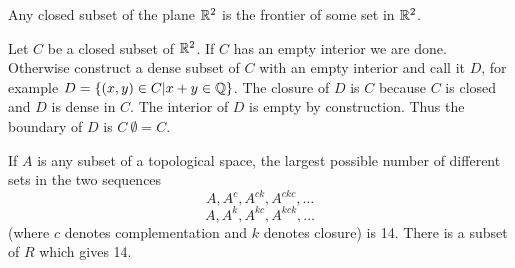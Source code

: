 \begin{problem}
  Any closed subset of the plane $\mathbb{R}^2$ is the frontier of some set in $\mathbb{R}^2$.
\end{problem}

\begin{solution}
  Let $C$ be a closed subset of $\mathbb{R}^2$.
  If $C$ has an empty interior we are done.
  Otherwise construct a dense subset of $C$ with an empty interior and call it $D$, for example $D = \{(x, y) \in C | x + y \in \mathbb{Q}\}$.
  The closure of $D$ is $C$ because $C$ is closed and $D$ is dense in $C$.
  The interior of $D$ is empty by construction.
  Thus the boundary of $D$ is $C \ \emptyset = C$.
\end{solution}

\begin{problem}
  If $A$ is any subset of a topological space, the largest possible number of different sets in the two sequences
  \[A, A^{c}, A^{ck}, A^{ckc}, \ldots\]
  \[A, A^{k}, A^{kc}, A^{kck}, \ldots\]
  (where $c$ denotes complementation and $k$ denotes closure) is 14.
  There is a subset of $R$ which gives 14.
\end{problem}

